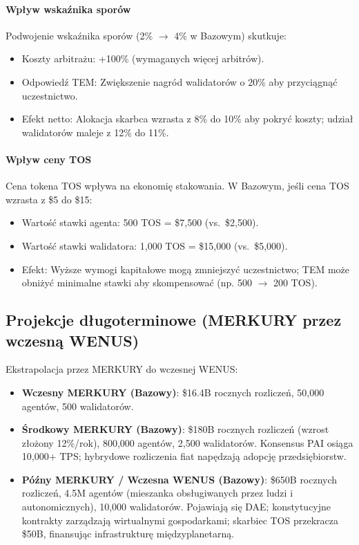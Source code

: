 \documentclass[11pt]{article}
\begin{document}
\paragraph{Wpływ wskaźnika sporów}
Podwojenie wskaźnika sporów (2\% $\to$ 4\% w Bazowym) skutkuje:
\begin{itemize}[noitemsep]
  \item Koszty arbitrażu: +100\% (wymaganych więcej arbitrów).
  \item Odpowiedź TEM: Zwiększenie nagród walidatorów o 20\% aby przyciągnąć uczestnictwo.
  \item Efekt netto: Alokacja skarbca wzrasta z 8\% do 10\% aby pokryć koszty; udział walidatorów maleje z 12\% do 11\%.
\end{itemize}

\paragraph{Wpływ ceny TOS}
Cena tokena TOS wpływa na ekonomię stakowania. W Bazowym, jeśli cena TOS wzrasta z \$5 do \$15:
\begin{itemize}[noitemsep]
  \item Wartość stawki agenta: 500 TOS = \$7{,}500 (vs.\ \$2{,}500).
  \item Wartość stawki walidatora: 1,000 TOS = \$15{,}000 (vs.\ \$5{,}000).
  \item Efekt: Wyższe wymogi kapitałowe mogą zmniejszyć uczestnictwo; TEM może obniżyć minimalne stawki aby skompensować (np. 500 $\to$ 200 TOS).
\end{itemize}

\subsection{Projekcje długoterminowe (MERKURY przez wczesną WENUS)}
Ekstrapolacja przez MERKURY do wczesnej WENUS:
\begin{itemize}[noitemsep]
  \item \textbf{Wczesny MERKURY (Bazowy)}: \$16.4B rocznych rozliczeń, 50,000 agentów, 500 walidatorów.
  \item \textbf{Środkowy MERKURY (Bazowy)}: \$180B rocznych rozliczeń (wzrost złożony 12\%/rok), 800,000 agentów, 2,500 walidatorów. Konsensus PAI osiąga 10,000+ TPS; hybrydowe rozliczenia fiat napędzają adopcję przedsiębiorstw.
  \item \textbf{Późny MERKURY / Wczesna WENUS (Bazowy)}: \$650B rocznych rozliczeń, 4.5M agentów (mieszanka obsługiwanych przez ludzi i autonomicznych), 10,000 walidatorów. Pojawiają się DAE; konstytucyjne kontrakty zarządzają wirtualnymi gospodarkami; skarbiec TOS przekracza \$50B, finansując infrastrukturę międzyplanetarną.
\end{itemize}
\end{document}
